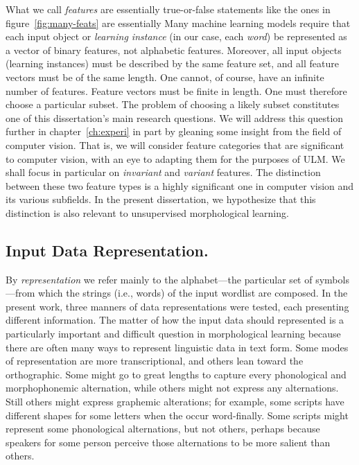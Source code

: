 What we call \emph{features} are essentially true-or-false statements like the ones in figure~\ref{fig:many-feats} are essentially 
Many machine learning models require that each input object or \emph{learning instance} 
(in our case, each \emph{word}) be represented as a vector of binary features, not alphabetic 
features. Moreover, all input objects (learning instances) must be described by the same feature 
set, and all feature vectors must be of the same length.
One cannot, of course, have an infinite number of features. Feature vectors must be finite in length.
One must therefore choose a particular subset. The problem of choosing a likely subset constitutes one of
this dissertation's main research questions. 
We will address this question further in chapter~\ref{ch:experi} in part by gleaning some insight
from the field of computer vision. That is, we will consider feature categories that 
are significant to computer vision, with an eye to adapting them for the purposes of ULM. 
We shall focus in particular on \emph{invariant} and \emph{variant} features.
The distinction between these two feature types is a highly significant one in
computer vision and its various subfields. In the present dissertation, we hypothesize that this distinction is
also relevant to unsupervised morphological learning. 


\subsection{Input Data Representation.} 
By \emph{representation} we refer mainly to the alphabet---the
particular set of symbols---from which the strings (i.e., words) of the input wordlist are composed.
In the present work, three manners of data representations were tested, each presenting different information. The matter of how the input data should represented is a particularly important and difficult question in morphological learning because there are often many ways to represent linguistic data in text form. Some modes of representation are more transcriptional, and others lean toward the orthographic. Some might go to great lengths to capture every phonological and morphophonemic alternation, while others might not express any alternations. Still others might express graphemic alterations; for example, some scripts have different shapes for some letters when the occur word-finally. Some scripts might represent some phonological alternations, but not others, perhaps because speakers for some person perceive those alternations to be more salient than others. 


